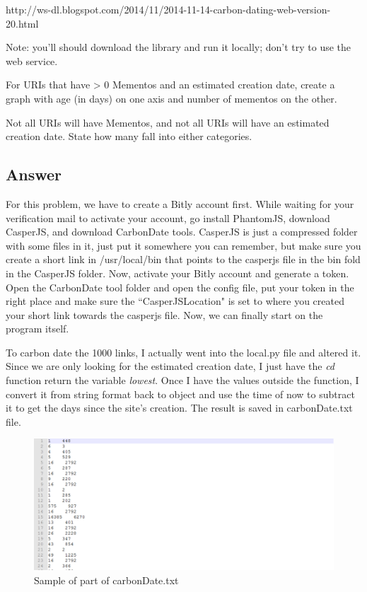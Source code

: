 \documentclass[12pt]{article}
\begin{document}
\noindent
http://ws-dl.blogspot.com/2014/11/2014-11-14-carbon-dating-web-version-20.html

\noindent
Note: you'll should download the library and run it locally; don't
try to use the web service.

\noindent
For URIs that have > 0 Mementos and an estimated creation date,
create a graph with age (in days) on one axis and number of mementos
on the other.  

\noindent
Not all URIs will have Mementos, and not all URIs will have an estimated
creation date.  State how many fall into either categories. 

\subsection*{Answer}
For this problem, we have to create a Bitly account first. While waiting for your verification mail to activate your account, go install PhantomJS, download CasperJS, and download CarbonDate tools. CasperJS is just a compressed folder with some files in it, just put it somewhere you can remember, but make sure you create a short link in /usr/local/bin that points to the casperjs file in the bin fold in the CasperJS folder. Now, activate your Bitly account and generate a token. Open the CarbonDate tool folder and open the config file, put your token in the right place and make sure the ``CasperJSLocation" is set to where you created your short link towards the casperjs file. Now, we can finally start on the program itself. 

To carbon date the 1000 links, I actually went into the local.py file and altered it. Since we are only looking for the estimated creation date, I just have the \textit{cd} function return the variable \textit{lowest}. Once I have the values outside the function, I convert it from string format back to object and use the time of now to subtract it to get the days since the site's creation. The result is saved in carbonDate.txt file.



\begin{figure}[h]
\centering
\includegraphics[width=6.5in]{carbonDate.png}
\caption{Sample of part of carbonDate.txt}
\end{figure}
\newpage
\end{document}
